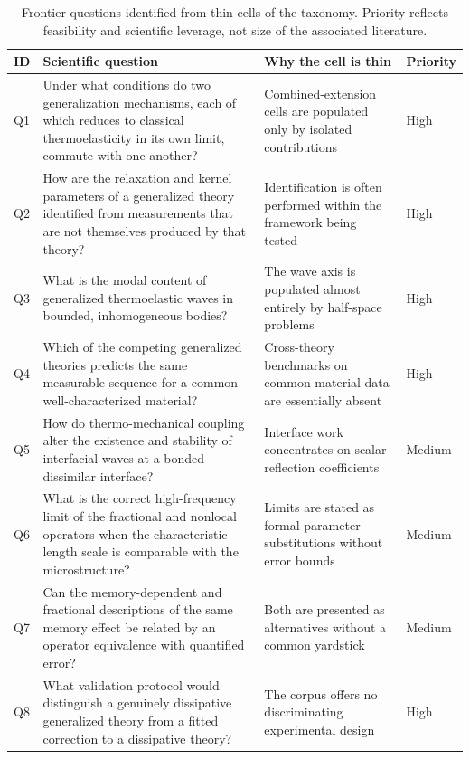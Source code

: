 \begin{table}[htbp]
\centering
\small
\caption{Frontier questions identified from thin cells of the taxonomy. Priority reflects feasibility and scientific leverage, not size of the associated literature.}
\label{tab:taxonomy_gaps}
\begin{tabularx}{\textwidth}{@{}p{1.4cm}X X p{1.4cm}@{}}
\toprule
\textbf{ID} & \textbf{Scientific question} & \textbf{Why the cell is thin} & \textbf{Priority} \\
\midrule
Q1 & Under what conditions do two generalization mechanisms, each of which reduces to classical thermoelasticity in its own limit, commute with one another? & Combined-extension cells are populated only by isolated contributions & High \\
Q2 & How are the relaxation and kernel parameters of a generalized theory identified from measurements that are not themselves produced by that theory? & Identification is often performed within the framework being tested & High \\
Q3 & What is the modal content of generalized thermoelastic waves in bounded, inhomogeneous bodies? & The wave axis is populated almost entirely by half-space problems & High \\
Q4 & Which of the competing generalized theories predicts the same measurable sequence for a common well-characterized material? & Cross-theory benchmarks on common material data are essentially absent & High \\
Q5 & How do thermo-mechanical coupling alter the existence and stability of interfacial waves at a bonded dissimilar interface? & Interface work concentrates on scalar reflection coefficients & Medium \\
Q6 & What is the correct high-frequency limit of the fractional and nonlocal operators when the characteristic length scale is comparable with the microstructure? & Limits are stated as formal parameter substitutions without error bounds & Medium \\
Q7 & Can the memory-dependent and fractional descriptions of the same memory effect be related by an operator equivalence with quantified error? & Both are presented as alternatives without a common yardstick & Medium \\
Q8 & What validation protocol would distinguish a genuinely dissipative generalized theory from a fitted correction to a dissipative theory? & The corpus offers no discriminating experimental design & High \\
\bottomrule
\end{tabularx}
\end{table}

